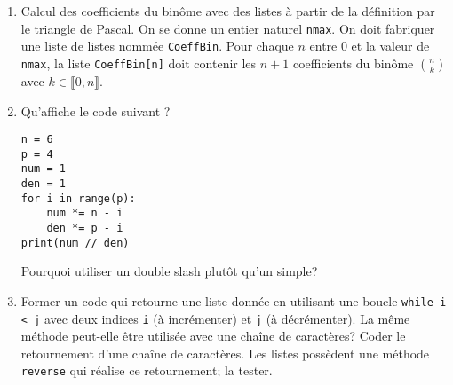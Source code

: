 \begin{enumerate}
  \item Calcul des coefficients du binôme avec des listes à partir de la définition par le triangle de Pascal.\newline
On se donne un entier naturel \texttt{nmax}. On doit fabriquer une liste de listes nommée \texttt{CoeffBin}. Pour chaque $n$ entre 0 et la valeur de \texttt{nmax}, la liste \texttt{CoeffBin[n]} doit contenir les $n+1$ coefficients du binôme $\binom{n}{k}$ avec $k\in \llbracket 0,n\rrbracket$.

 \item Qu'affiche le code suivant ?
\begin{verbatim}
n = 6
p = 4
num = 1
den = 1
for i in range(p):
    num *= n - i
    den *= p - i
print(num // den)\end{verbatim}
Pourquoi utiliser un double slash plutôt qu'un simple?

\item Former un code qui retourne une liste donnée en utilisant une boucle \texttt{while  i < j} avec deux indices \texttt{i} (à incrémenter) et \texttt{j} (à décrémenter).\newline
La même méthode peut-elle être utilisée avec une chaîne de caractères? Coder le retournement d'une chaîne de caractères.\newline
Les listes possèdent une méthode \texttt{reverse} qui réalise ce retournement; la tester.
 \end{enumerate}
